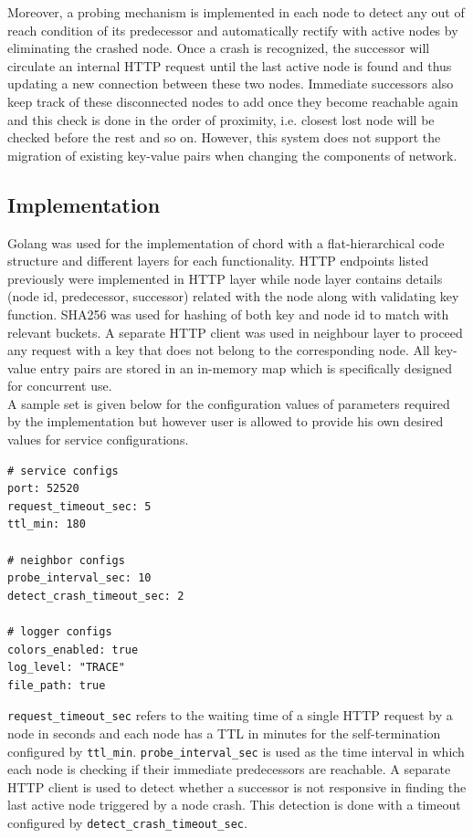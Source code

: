 \documentclass[
    a4paper,
    twocolumn,
]{article}
\begin{document}
Moreover, a probing mechanism is implemented in each node to detect any out of reach condition of its predecessor and automatically rectify with active nodes by eliminating the crashed node. Once a crash is recognized, the successor will circulate an internal HTTP request until the last active node is found and thus updating a new connection between these two nodes. Immediate successors also keep track of these disconnected nodes to add once they become reachable again and this check is done in the order of proximity, i.e. closest lost node will be checked before the rest and so on. However, this system does not support the migration of existing key-value pairs when changing the components of network.

\subsection{Implementation}

Golang was used for the implementation of chord with a flat-hierarchical code structure and different layers for each functionality. HTTP endpoints listed previously were implemented in HTTP layer while node layer contains details (node id, predecessor, successor) related with the node along with validating key function. SHA256 was used for hashing of both key and node id to match with relevant buckets. A separate HTTP client was used in neighbour layer to proceed any request with a key that does not belong to the corresponding node. All key-value entry pairs are stored in an in-memory map which is specifically designed for concurrent use.\\

A sample set is given below for the configuration values of parameters required by the implementation but however user is allowed to provide his own desired values for service configurations. 

\begin{verbatim}
# service configs
port: 52520
request_timeout_sec: 5
ttl_min: 180

# neighbor configs
probe_interval_sec: 10
detect_crash_timeout_sec: 2

# logger configs
colors_enabled: true
log_level: "TRACE"
file_path: true
\end{verbatim}

\texttt{request\_timeout\_sec} refers to the waiting time of a single HTTP request by a node in seconds and each node has a TTL in minutes for the self-termination configured by \texttt{ttl\_min}. \texttt{probe\_interval\_sec} is used as the time interval in which each node is checking if their immediate predecessors are reachable. A separate HTTP client is used to detect whether a successor is not responsive in finding the last active node triggered by a node crash. This detection is done with a timeout configured by \texttt{detect\_crash\_timeout\_sec}.
\end{document}
